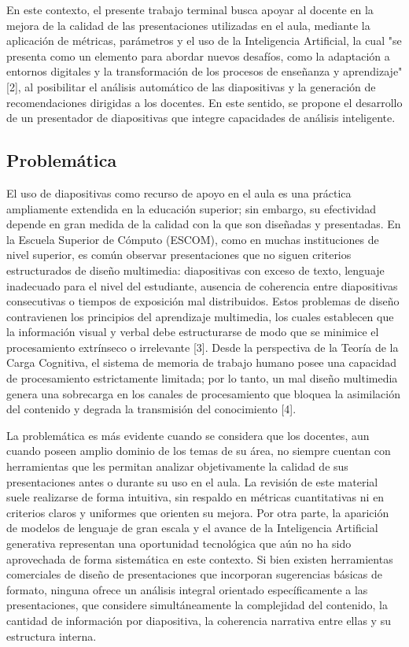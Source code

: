 \documentclass[11pt]{article}
\begin{document}
En este contexto, el presente trabajo terminal busca apoyar al docente en la mejora de la calidad de las presentaciones utilizadas en el aula, mediante la aplicación de métricas, parámetros y el uso de la Inteligencia Artificial, la cual "se presenta como un elemento para abordar nuevos desafíos, como la adaptación a entornos digitales y la transformación de los procesos de enseñanza y aprendizaje" [2], al posibilitar el análisis automático de las diapositivas y la generación de recomendaciones dirigidas a los docentes. En este sentido, se propone el desarrollo de un presentador de diapositivas que integre capacidades de análisis inteligente.


\subsection*{Problemática}
El uso de diapositivas como recurso de apoyo en el aula es una práctica ampliamente extendida en la educación superior; sin embargo, su efectividad depende en gran medida de la calidad con la que son diseñadas y presentadas. En la Escuela Superior de Cómputo (ESCOM), como en muchas instituciones de nivel superior, es común observar presentaciones que no siguen criterios estructurados de diseño multimedia: diapositivas con exceso de texto, lenguaje inadecuado para el nivel del estudiante, ausencia de coherencia entre diapositivas consecutivas o tiempos de exposición mal distribuidos. Estos problemas de diseño contravienen los principios del aprendizaje multimedia, los cuales establecen que la información visual y verbal debe estructurarse de modo que se minimice el procesamiento extrínseco o irrelevante [3]. Desde la perspectiva de la Teoría de la Carga Cognitiva, el sistema de memoria de trabajo humano posee una capacidad de procesamiento estrictamente limitada; por lo tanto, un mal diseño multimedia genera una sobrecarga en los canales de procesamiento que bloquea la asimilación del contenido y degrada la transmisión del conocimiento [4].

La problemática es más evidente cuando se considera que los docentes, aun cuando poseen amplio dominio de los temas de su área, no siempre cuentan con herramientas que les permitan analizar objetivamente la calidad de sus presentaciones antes o durante su uso en el aula. La revisión de este material suele realizarse de forma intuitiva, sin respaldo en métricas cuantitativas ni en criterios claros y uniformes que orienten su mejora.
Por otra parte, la aparición de modelos de lenguaje de gran escala y el avance de la Inteligencia Artificial generativa representan una oportunidad tecnológica que aún no ha sido aprovechada de forma sistemática en este contexto. Si bien existen herramientas comerciales de diseño de presentaciones que incorporan sugerencias básicas de formato, ninguna ofrece un análisis integral orientado específicamente a las presentaciones, que considere simultáneamente la complejidad del contenido, la cantidad de información por diapositiva, la coherencia narrativa entre ellas y su estructura interna.
\end{document}
